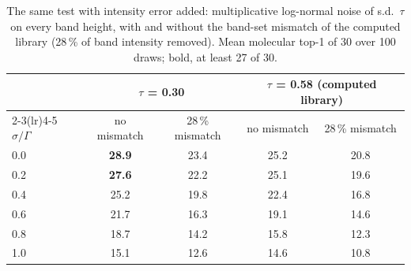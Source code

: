 \begin{table}[htbp]
\centering
\caption{The same test with intensity error added: multiplicative log-normal noise of s.d.\
$\tau$ on every band height, with and without the band-set mismatch of the computed library
(28\,\% of band intensity removed). Mean molecular top-1 of 30 over 100 draws; bold, at least
27 of 30.}
\label{tab:si-errinject-tau}
\small
\begin{tabular}{lcccc}
\toprule
 & \multicolumn{2}{c}{$\tau$ = 0.30} & \multicolumn{2}{c}{$\tau$ = 0.58 (computed library)} \\
\cmidrule(lr){2-3}\cmidrule(lr){4-5}
$\sigma/\Gamma$ & no mismatch & 28\,\% mismatch & no mismatch & 28\,\% mismatch \\
\midrule
0.0 & \textbf{28.9} & 23.4 & 25.2 & 20.8 \\
0.2 & \textbf{27.6} & 22.2 & 25.1 & 19.6 \\
0.4 & 25.2 & 19.8 & 22.4 & 16.8 \\
0.6 & 21.7 & 16.3 & 19.1 & 14.6 \\
0.8 & 18.7 & 14.2 & 15.8 & 12.3 \\
1.0 & 15.1 & 12.6 & 14.6 & 10.8 \\
\bottomrule
\end{tabular}
\end{table}
